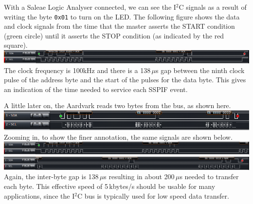 \documentclass[12pt,a4paper]{article}
\newcommand{\code}[2]{
 \hrulefill
 \scriptsize
 
 \hrulefill
 \vspace{2em}
 \normalsize
}
\begin{document}
\bigskip
\noindent
\code{}{../pic18/i2c-slave.txt}

\medskip\noindent
With a Saleae Logic Analyser connected, we can see the I$^2$C 
signals as a result of writing the byte \texttt{0x01} to turn on the LED.
The following figure shows the data and clock signals from the time that the
master asserts the START condition (green circle) 
until it asserts the STOP condition (as indicated by the red square).\\
\includegraphics[width=\textwidth]{../figs/i2c-aardvark-write-byte.png} \\
The clock frequency is 100kHz and there is a 138\,$\mu$s gap 
between the ninth clock pulse of the address byte and
the start of the pulses for the data byte.
This gives an indication of the time needed to service each SSPIF event.

\medskip\noindent
A little later on, the Aardvark reads two bytes from the bus, as shown here.\\
\includegraphics[width=\textwidth]{../figs/i2c-aardvark-read-2-bytes.png}\\
Zooming in, to show the finer annotation, the same signals are shown below.\\
\includegraphics[width=\textwidth]{../figs/i2c-aardvark-read-2-bytes-zoom-to-start.png}\\
\includegraphics[width=\textwidth]{../figs/i2c-aardvark-read-2-bytes-zoom-to-nack.png}\\
Again, the inter-byte gap is 138\,$\mu$s resulting in about 200\,$\mu$s 
needed to transfer each byte.
This effective speed of 5\,kbytes/s should be usable for many applications,
since the I$^2$C bus is typically used for low speed data transfer.
\end{document}
